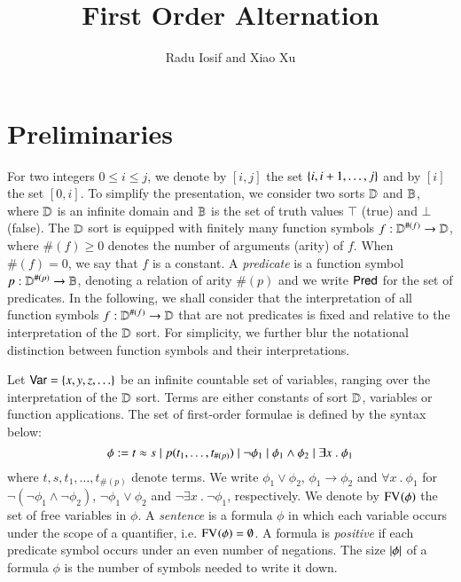 \documentclass{llncs}
\begin{document}

\title{First Order Alternation}

\author{Radu Iosif and Xiao Xu}

\maketitle

\begin{abstract}
\end{abstract}

\section{Preliminaries}

For two integers $0 \leq i \leq j$, we denote by $[i,j]$ the set
$\{ i,i+1,\ldots,j \}$ and by $[i]$ the set $[0,i]$. To simplify the
presentation, we consider two sorts $\mathbb{D}$ and $\mathbb{B}$, where $\mathbb{D}$
is an infinite domain and $\mathbb{B}$ is the set of truth values $\top$
(true) and $\bot$ (false). The $\mathbb{D}$ sort is equipped with finitely
many function symbols $f : \mathbb{D}^{\#(f)} \rightarrow \mathbb{D}$, where
$\#(f)\geq0$ denotes the number of arguments (arity) of $f$. When
$\#(f)=0$, we say that $f$ is a constant. A \emph{predicate} is a
function symbol $p : \mathbb{D}^{\#(p)} \rightarrow \mathbb{B}$, denoting a
relation of arity $\#(p)$ and we write $\mathsf{Pred}$ for the set of
predicates. In the following, we shall consider that the
interpretation of all function symbols $f : \mathbb{D}^{\#(f)} \rightarrow
\mathbb{D}$ that are not predicates is fixed and relative to the
interpretation of the $\mathbb{D}$ sort. For simplicity, we further blur
the notational distinction between function symbols and their
interpretations.

Let $\mathsf{Var} = \{ x,y,z,\ldots \}$ be an infinite countable set of
variables, ranging over the interpretation of the $\mathbb{D}$ sort. Terms
are either constants of sort $\mathbb{D}$, variables or function
applications. The set of first-order formulae is defined by the syntax
below:
\[\phi := t \approx s \mid p(t_1,\ldots,t_{\#(p)}) 
\mid \neg \phi_1 \mid \phi_1 \wedge \phi_2 \mid \exists x ~.~
\phi_1 \] where $t,s,t_1,\ldots,t_{\#(p)}$ denote terms. We write
$\phi_1 \vee \phi_2$, $\phi_1 \rightarrow \phi_2$ and $\forall x ~.~
\phi_1$ for $\neg(\neg\phi_1 \wedge \neg\phi_2)$, $\neg\phi_1 \vee
\phi_2$ and $\neg\exists x ~.~ \neg\phi_1$, respectively. We denote by
$\mathrm{FV}_{}(\phi)$ the set of free variables in $\phi$. A \emph{sentence}
is a formula $\phi$ in which each variable occurs under the scope of a
quantifier, i.e. $\mathrm{FV}_{}(\phi) = \emptyset$. A formula is
\emph{positive} if each predicate symbol occurs under an even number
of negations. The size ${|{\phi}|}$ of a formula $\phi$ is the number
of symbols needed to write it down.
\end{document}
